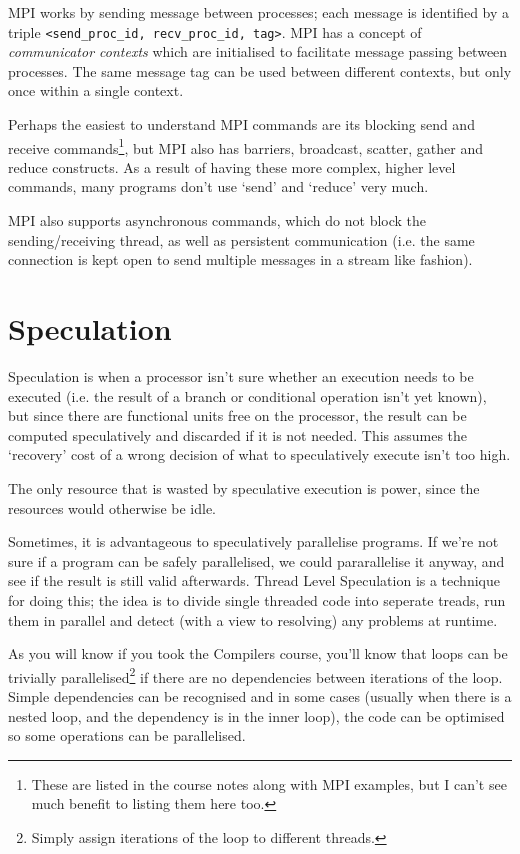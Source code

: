 MPI works by sending message between processes; each message is
identified by a triple \texttt{<send\_proc\_id, recv\_proc\_id,
tag>}. MPI has a concept of \textit{communicator contexts} which are
initialised to facilitate message passing between processes. The same
message tag can be used between different contexts, but only once
within a single context.

Perhaps the easiest to understand MPI commands are its blocking send
and receive commands\footnote{These are listed in the course notes
along with MPI examples, but I can't see much benefit to listing them
here too.}, but MPI also has barriers, broadcast, scatter, gather and
reduce constructs. As a result of having these more complex, higher
level commands, many programs don't use `send' and `reduce' very much.

MPI also supports asynchronous commands, which do not block the
sending/receiving thread, as well as persistent communication (i.e. the
same connection is kept open to send multiple messages in a stream
like fashion).


\section{Speculation}

Speculation is when a processor isn't sure whether an execution needs
to be executed (i.e. the result of a branch or conditional operation
isn't yet known), but since there are functional units free on the
processor, the result can be computed speculatively and discarded if
it is not needed. This assumes the `recovery' cost of a wrong decision
of what to speculatively execute isn't too high.

The only resource that is wasted by speculative execution is power,
since the resources would otherwise be idle.

Sometimes, it is advantageous to speculatively parallelise
programs. If we're not sure if a program can be safely parallelised,
we could pararallelise it anyway, and see if the result is still valid
afterwards. Thread Level Speculation is a technique for doing this;
the idea is to divide single threaded code into seperate treads, run
them in parallel and detect (with a view to resolving) any problems at
runtime.

As you will know if you took the Compilers course, you'll know that
loops can be trivially parallelised\footnote{Simply assign iterations
of the loop to different threads.} if there are no dependencies
between iterations of the loop. Simple dependencies can be recognised
and in some cases (usually when there is a nested loop, and the
dependency is in the inner loop), the code can be optimised so some
operations can be parallelised.

